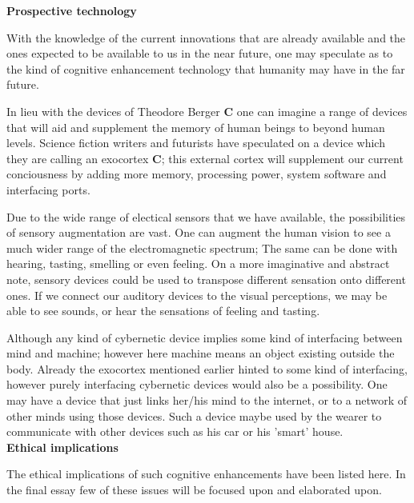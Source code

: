 {\bf Prospective technology}

With the knowledge of the current innovations that are already available and the ones expected to be available to us in the near future, one may speculate as to the kind of cognitive enhancement technology that humanity may have in the far future.

In lieu with the devices of Theodore Berger {\bf C} one can imagine a range of devices that will aid and supplement the memory of human beings to beyond human levels. Science fiction writers and futurists have speculated on a device which they are calling an exocortex {\bf C}; this external cortex will supplement our current conciousness by adding more memory, processing power, system software and interfacing ports.

Due to the wide range of electical sensors that we have available, the possibilities of sensory augmentation are vast. One can augment the human vision to see a much wider range of the electromagnetic spectrum; The same can be done with hearing, tasting, smelling or even feeling. On a more imaginative and abstract note, sensory devices could be used to transpose different sensation onto different ones. If we connect our auditory devices to the visual perceptions, we may be able to see sounds, or hear the sensations of feeling and tasting.

Although any kind of cybernetic device implies some kind of interfacing between mind and machine; however here machine means an object existing outside the body. Already the exocortex mentioned earlier hinted to some kind of interfacing, however purely interfacing cybernetic devices would also be a possibility. One may have a device that just links her/his mind to the internet, or to a network of other minds using those devices. Such a device maybe used by the wearer to communicate with other devices such as his car or his 'smart' house. \\

{\bf Ethical implications}

The ethical implications of such cognitive enhancements have been listed here. In the final essay few of these issues will be focused upon and elaborated upon.

